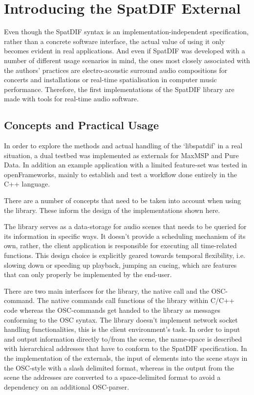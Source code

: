 \documentclass{article}
\begin{document}
\section{Introducing the SpatDIF External}\label{sec:Intro}
Even though the SpatDIF syntax is an implementation-independent specification, rather than a concrete software interface, the actual value of using it only becomes evident in real applications. And even if SpatDIF was developed with a number of different usage scenarios in mind, the ones most closely associated with the authors' practices are electro-acoustic surround audio compositions for concerts and installations or real-time spatialisation in computer music performance.
Therefore, the first implementations of the SpatDIF library are made with tools for real-time audio software.

\subsection{Concepts and Practical Usage}\label{subsec:concepts}
In order to explore the methods and actual handling of the `libspatdif' in a real situation, a dual testbed was implemented as externals for MaxMSP and Pure Data. 
In addition an example application with a limited feature-set was tested in openFrameworks, mainly to establish and test a workflow done entirely in the C++ language.

There are a number of concepts that need to be taken into account when using the library.
These inform the design of the implementations shown here.

The library serves as a data-storage for audio scenes that needs to be queried for its information in specific ways.
It doesn't provide a scheduling mechanism of its own, rather, the client application is responsible for executing all time-related functions.
This design choice is explicitly geared towards temporal flexibility, i.e. slowing down or speeding up playback, jumping an cueing, which are features that can only properly be implemented by the end-user.

There are two main interfaces for the library, the native call and the OSC-command.
The native commands call functions of the library within C/C++ code whereas the OSC-commands get handed to the library as messages conforming to the OSC syntax.
The library doesn't implement network socket handling functionalities, this is the client environment's task.
In order to input and output information directly to/from the scene, the name-space is described with hierarchical addresses that have to conform to the SpatDIF specification.
In the implementation of the externals, the input of elements into the scene stays in the OSC-style with a slash delimited format, whereas in the output from the scene the addresses are converted to a space-delimited format to avoid a dependency on an additional OSC-parser.
\end{document}
